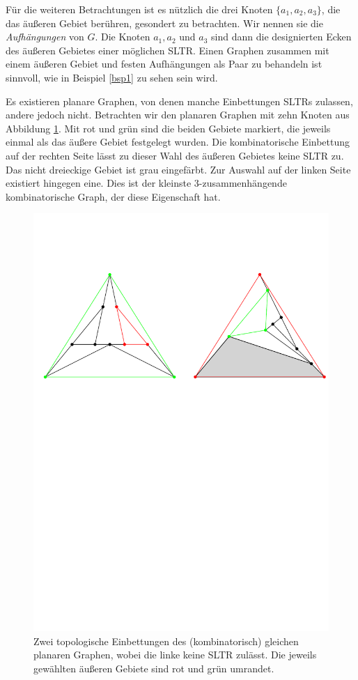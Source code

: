 Für die weiteren Betrachtungen ist es nützlich die drei Knoten $\{a_1,a_2,a_3\}$, die das äußeren Gebiet berühren, gesondert zu betrachten. Wir nennen sie die \textit{Aufhängungen} von $G$. Die Knoten $a_1,a_2$ und $a_3$ sind dann die designierten Ecken des äußeren Gebietes einer möglichen SLTR. Einen Graphen zusammen mit einem äußeren Gebiet und festen Aufhängungen als Paar zu behandeln ist sinnvoll, wie in Beispiel \ref{bsp1} zu sehen sein wird.

\begin{example}\label{bsp1}
Es existieren planare Graphen, von denen manche Einbettungen SLTRs zulassen, andere jedoch nicht. Betrachten wir den planaren Graphen mit zehn Knoten aus Abbildung \ref{10_example}. Mit rot und grün sind die beiden Gebiete markiert, die jeweils einmal als das äußere Gebiet festgelegt wurden. Die kombinatorische Einbettung auf der rechten Seite lässt zu dieser Wahl des äußeren Gebietes keine SLTR zu. Das nicht dreieckige Gebiet ist grau eingefärbt. Zur Auswahl auf der linken Seite existiert hingegen eine. Dies ist der kleinste 3-zusammenhängende kombinatorische Graph, der diese Eigenschaft hat.

\begin{figure}[h]
\centering
\includegraphics[width=1\textwidth]{10_with_sltr.pdf}
\caption{Zwei topologische Einbettungen des (kombinatorisch) gleichen planaren Graphen, wobei die linke keine SLTR zulässt. Die jeweils gewählten äußeren Gebiete sind rot und grün umrandet.}
\label{10_example}
\end{figure}


\end{example}

